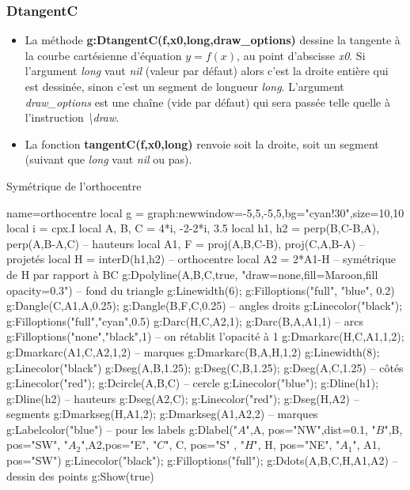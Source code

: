 \subsubsection{ DtangentC}
\begin{itemize}
    \item La méthode \textbf{g:DtangentC(f,x0,long,draw\_options)} dessine la tangente à la courbe cartésienne d'équation \(y=f(x)\), au point d'abscisse \emph{x0}. Si l'argument \emph{long} vaut \emph{nil} (valeur par défaut) alors c'est la droite entière qui est dessinée, sinon c'est un segment de longueur \emph{long}. L'argument \emph{draw\_options} est une chaîne (vide par défaut) qui sera passée telle quelle à l'instruction \emph{\textbackslash draw}.
    \item La fonction \textbf{tangentC(f,x0,long)} renvoie soit la droite, soit un segment (suivant que \emph{long} vaut \emph{nil} ou pas).
\end{itemize}
  

\begin{demo}{Symétrique de l'orthocentre}
\begin{luadraw}{name=orthocentre}
local g = graph:new{window={-5,5,-5,5},bg="cyan!30",size={10,10}}
local i = cpx.I
local A, B, C = 4*i, -2-2*i, 3.5
local h1, h2 = perp({B,C-B},A), perp({A,B-A},C) -- hauteurs
local A1, F = proj(A,{B,C-B}), proj(C,{A,B-A}) -- projetés
local H = interD(h1,h2) -- orthocentre
local A2 = 2*A1-H -- symétrique de H par rapport à BC
g:Dpolyline({A,B,C},true, "draw=none,fill=Maroon,fill opacity=0.3") -- fond du triangle
g:Linewidth(6); g:Filloptions("full", "blue", 0.2)
g:Dangle(C,A1,A,0.25); g:Dangle(B,F,C,0.25) -- angles droits
g:Linecolor("black"); g:Filloptions("full","cyan",0.5)
g:Darc(H,C,A2,1); g:Darc(B,A,A1,1) -- arcs
g:Filloptions("none","black",1) -- on rétablit l'opacité à 1
g:Dmarkarc(H,C,A1,1,2); g:Dmarkarc(A1,C,A2,1,2) -- marques
g:Dmarkarc(B,A,H,1,2)
g:Linewidth(8); g:Linecolor("black")
g:Dseg({A,B},1.25); g:Dseg({C,B},1.25); g:Dseg({A,C},1.25) -- côtés
g:Linecolor("red"); g:Dcircle(A,B,C) -- cercle
g:Linecolor("blue"); g:Dline(h1); g:Dline(h2) -- hauteurs
g:Dseg({A2,C}); g:Linecolor("red"); g:Dseg({H,A2}) -- segments
g:Dmarkseg(H,A1,2); g:Dmarkseg(A1,A2,2) -- marques
g:Labelcolor("blue") -- pour les labels
g:Dlabel("$A$",A, {pos="NW",dist=0.1}, "$B$",B, {pos="SW"}, "$A_2$",A2,{pos="E"}, "$C$", C, {pos="S" }, "$H$", H, {pos="NE"}, "$A_1$", A1, {pos="SW"})
g:Linecolor("black"); g:Filloptions("full"); g:Ddots({A,B,C,H,A1,A2}) -- dessin des points
g:Show(true)
\end{luadraw}
\end{demo}


